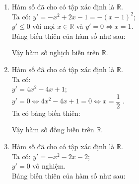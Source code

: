 \begin{vd}
{\begin{enumerate}
\begin{center}
            \end{center}
            Vậy hàm số đã cho đồng biến trên $(-1;1)$, nghịch biến trên $(-\infty,-1), (1;+\infty)$.
            \item %
            Hàm số đã cho có tập xác định là $\mathbb{R}$.\\
            Ta có: $y'=-x^2+2x-1=-\left(x-1\right)^2$;\\
            $y'\leq 0$ với mọi $x \in \mathbb{R}$ và $y'=0\Leftrightarrow x=1$.\\
            Bảng biến thiên của hàm số như sau:
            \begin{center}
            \end{center}
            Vậy hàm số nghịch biến trên $\mathbb{R}$.
            \item %
            Hàm số đã cho có tập xác định là $\mathbb{R}$.\\
            Ta có:\\ $y'=4x^2-4x+1$;\\
            $y'=0\Leftrightarrow 4x^2-4x+1=0\Leftrightarrow x=\dfrac{1}{2}$ .\\
            Ta có bảng biến thiên:
            \begin{center}
            \end{center}
            Vậy hàm số đồng biến trên $\mathbb{R}$.
            \item %
            Hàm số đã cho có tập xác định là $\mathbb{R}$.\\
            Ta có: $y'=-x^2-2x-2$;\\
            $y'=0$ vô nghiệm.\\
            Bảng biến thiên của hàm số như sau:
            \begin{center}
                \begin{tikzpicture}

\end{tikzpicture}
\end{center}
\end{enumerate}}
\end{vd}
